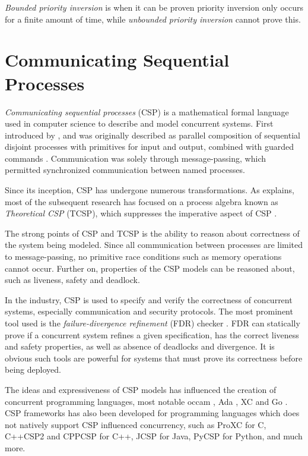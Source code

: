 \textit{Bounded priority inversion} is when it can be proven priority inversion only occurs for a finite amount of time, while \textit{unbounded priority inversion} cannot prove this. 


\section{Communicating Sequential Processes}
\label{sec:csp}


\textit{Communicating sequential processes} (CSP) is a mathematical formal language used in computer science to describe and model concurrent systems. First introduced by \citet{hoare1978communicating}, and was originally described as parallel composition of sequential disjoint processes with primitives for input and output, combined with guarded commands \citep{dijkstra1975guarded}. Communication was solely through message\hyp{}passing, which permitted synchronized communication between named processes.

Since its inception, CSP has undergone numerous transformations. As \citet{abdallah2005communicating} explains, most of the subsequent research has focused on a process algebra known as \textit{Theoretical CSP} (TCSP), which suppresses the imperative aspect of CSP \citep{brookes1984theory}. 

The strong points of CSP and TCSP is the ability to reason about correctness of the system being modeled. Since all communication between processes are limited to message\hyp{}passing, no primitive race conditions such as memory operations cannot occur. Further on, properties of the CSP models can be reasoned about, such as liveness, safety and deadlock.

In the industry, CSP is used to specify and verify the correctness of concurrent systems, especially communication and security protocols. The most prominent tool used is the \textit{failure\hyp{}divergence refinement} (FDR) checker \citep{manual2000failures}. FDR can statically prove if a concurrent system refines a given specification, has the correct liveness and safety properties, as well as absence of deadlocks and divergence. It is obvious such tools are powerful for systems that must prove its correctness before being deployed.

The ideas and expressiveness of CSP models has influenced the creation of concurrent programming languages, most notable occam \citep{inmos1988occam}, Ada \citep{ledgard1983reference}, XC \citep{douglas2009programming} and Go \citep{go2009go}. CSP frameworks has also been developed for programming languages which does not natively support CSP influenced concurrency, such as ProXC \citep{pettersen2016proxc} for C, C++CSP2 \citep{brown2007c++csp2} and CPPCSP \citep{chalmers2016cppcsp} for C++, JCSP \citep{welch2007jcsp} for Java, PyCSP \citep{bjorndalen2007pycsp} for Python, and much more.

